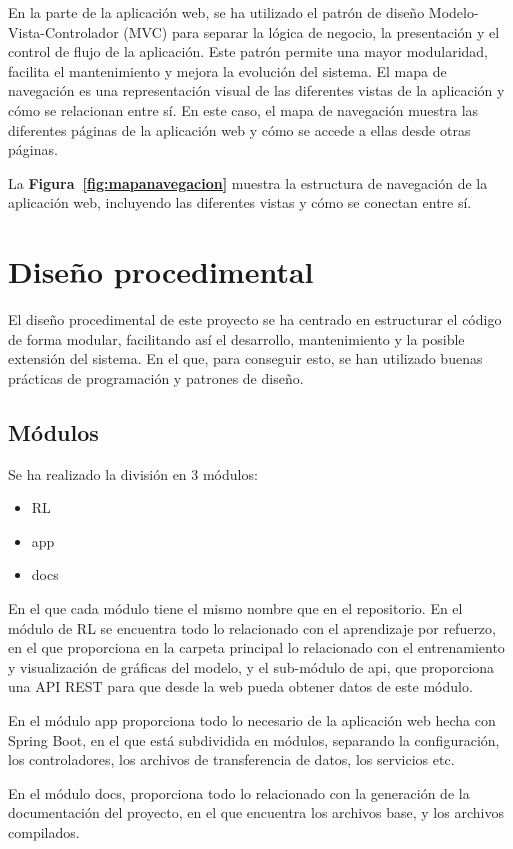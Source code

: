 En la parte de la aplicación web, se ha utilizado el patrón de diseño Modelo-Vista-Controlador (MVC) para separar la lógica de negocio, la presentación y el control de flujo de la aplicación. Este patrón permite una mayor modularidad, facilita el mantenimiento y mejora la evolución del sistema. 
El mapa de navegación es una representación visual de las diferentes vistas de la aplicación y cómo se relacionan entre sí. En este caso, el mapa de navegación muestra las diferentes páginas de la aplicación web y cómo se accede a ellas desde otras páginas.

La \textbf{Figura~\ref{fig:mapanavegacion}} muestra la estructura de navegación de la aplicación web, incluyendo las diferentes vistas y cómo se conectan entre sí.

\section{Diseño procedimental}
El diseño procedimental de este proyecto se ha centrado en estructurar el código de forma modular, facilitando así el desarrollo, mantenimiento y la posible extensión del sistema. En el que, para conseguir esto, se han utilizado buenas prácticas de programación y patrones de diseño. 

\subsection{Módulos}
Se ha realizado la división en 3 módulos:
\begin{itemize}
    \item RL
    \item app
    \item docs
\end{itemize}
En el que cada módulo tiene el mismo nombre que en el repositorio.
En el módulo de RL se encuentra todo lo relacionado con el aprendizaje por refuerzo, en el que proporciona en la carpeta principal lo relacionado con el entrenamiento y visualización de gráficas del modelo, y el sub-módulo de api, que proporciona una API REST para que desde la web pueda obtener datos de este módulo.

En el módulo app proporciona todo lo necesario de la aplicación web hecha con Spring Boot, en el que está subdividida en módulos, separando la configuración, los controladores, los archivos de transferencia de datos, los servicios etc.

En el módulo docs, proporciona todo lo relacionado con la generación de la documentación del proyecto, en el que encuentra los archivos base, y los archivos compilados.

